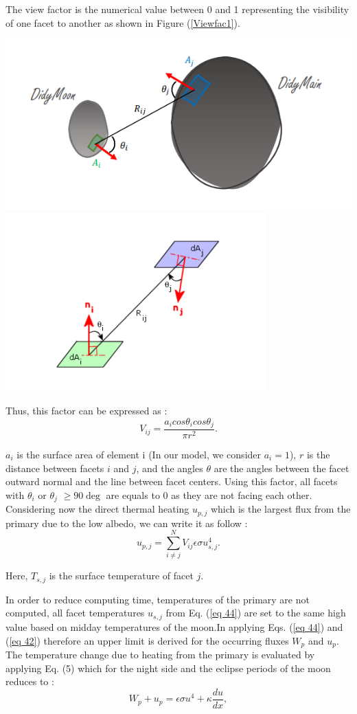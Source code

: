 The view factor is the numerical value between 0 and 1 representing the visibility of one facet to another as shown in Figure (\ref{Viewfac1}). \\
\begin{center}
    \includegraphics[width=.4\linewidth]{rsc/viewfac1.png} 
    \includegraphics[width=.4\linewidth]{rsc/viewfac2.png}
\end{center}

Thus, this factor can be expressed as :
\begin{equation}
    V_{ij}=\frac{a_i cos \theta _i cos \theta _j}{\pi r^2}.
    \label{eq 43}
\end{equation}

$a_i$ is the surface area of element i (In our model, we consider $a_i=1$), $r$ is the distance between facets $i$ and $j$, and the angles $\theta$ are the angles between the facet outward normal and the line between facet centers. Using this factor, all facets with $\theta _i$ or $\theta _j$ $\geq 90 \deg $ are equals to 0 as they are not facing each other. \\

Considering now the direct thermal heating $u_{p,j}$ which is the largest flux from the primary due to the low albedo, we can write it as follow :
\begin{equation}
    u_{p,j}=\sum_{i \neq j}^N V_{ij} \epsilon \sigma u^4_{s,j}.
    \label{eq 44}
\end{equation}

Here, $T_{s,j}$ is the surface temperature of facet $j$.

In order to reduce computing time, temperatures of the primary are not computed, all facet temperatures $u_{s,j}$ from Eq. (\ref{eq 44}) are set to the same high value based on midday temperatures of the moon.In applying Eqs. (\ref{eq 44}) and (\ref{eq 42}) therefore an upper limit is derived for the occurring fluxes $W_p$ and $u_p$. The temperature change due to heating from the primary is evaluated by applying Eq. (5) which for the night side and the eclipse periods of the moon reduces to :
\begin{equation}
    W_p + u_p = \epsilon \sigma u^4 + \kappa \frac{du}{dx},
    \label{eq 45}
\end{equation}


